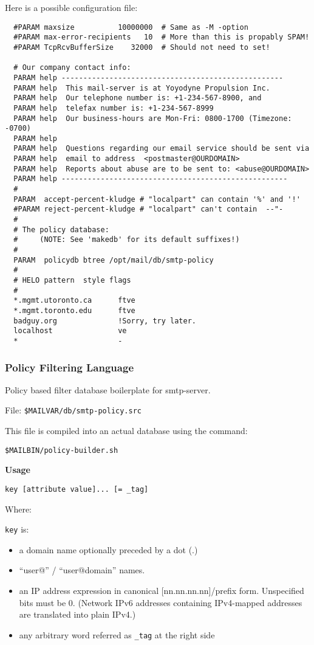 Here is a possible configuration file:

\begin{verbatim}
  #PARAM maxsize          10000000  # Same as -M -option
  #PARAM max-error-recipients   10  # More than this is propably SPAM! 
  #PARAM TcpRcvBufferSize    32000  # Should not need to set!

  # Our company contact info:
  PARAM help ---------------------------------------------------
  PARAM help  This mail-server is at Yoyodyne Propulsion Inc. 
  PARAM help  Our telephone number is: +1-234-567-8900, and 
  PARAM help  telefax number is: +1-234-567-8999
  PARAM help  Our business-hours are Mon-Fri: 0800-1700 (Timezone: -0700) 
  PARAM help
  PARAM help  Questions regarding our email service should be sent via 
  PARAM help  email to address  <postmaster@OURDOMAIN>
  PARAM help  Reports about abuse are to be sent to: <abuse@OURDOMAIN> 
  PARAM help ----------------------------------------------------
  #
  PARAM  accept-percent-kludge # "localpart" can contain '%' and '!' 
  #PARAM reject-percent-kludge # "localpart" can't contain  --"-
  #
  # The policy database:
  #     (NOTE: See 'makedb' for its default suffixes!)
  #
  PARAM  policydb btree /opt/mail/db/smtp-policy
  #
  # HELO pattern  style flags
  #
  *.mgmt.utoronto.ca      ftve
  *.mgmt.toronto.edu      ftve
  badguy.org              !Sorry, try later.
  localhost               ve
  *                       -
\end{verbatim}



\subsubsection{Policy Filtering Language}


Policy based filter database boilerplate for smtp-server.

File:  {\tt \$MAILVAR/db/smtp-policy.src}

This file is compiled into an actual database using the command:

{\tt \$MAILBIN/policy-builder.sh}

{\bf Usage}

{\tt  key [attribute value]... [= \_tag]}

Where:

{\tt key} is: 

\begin{itemize}
\item a domain name optionally preceded by a dot (.)
\item ``user@'' / ``user@domain'' names.
\item an IP address expression in canonical [nn.nn.nn.nn]/prefix form. 
Unspecified bits must be 0. (Network IPv6 addresses containing IPv4-mapped 
addresses are translated into plain IPv4.)
\item any arbitrary word referred as {\tt \_tag} at the right side
\end{itemize}

